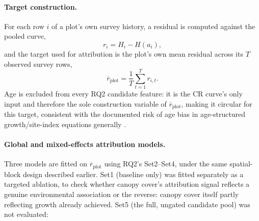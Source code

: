 \documentclass[11pt,a4paper]{report}
\begin{document}
\paragraph*{Target construction.}
For each row $i$ of a plot's own survey history, a residual is computed against the pooled curve,
\begin{equation}
r_i = H_i - H(a_i),
\label{eq:cr-residual}
\end{equation}
and the target used for attribution is the plot's own mean residual across its $T$ observed
survey rows,
\begin{equation}
\overline{r}_{\text{plot}} = \frac{1}{T}\sum_{t=1}^{T} r_{i,t}.
\label{eq:mean-cr-residual}
\end{equation}
Age is excluded from every RQ2 candidate feature: it is the CR curve's only input and therefore
the sole construction variable of $\overline{r}_{\text{plot}}$, making it circular for this
target, consistent with the documented risk of age bias in age-structured growth/site-index
equations generally \citep{socha2016AgeBias}. %

\paragraph*{Global and mixed-effects attribution models.}
Three models are fitted on $\overline{r}_{\text{plot}}$ using RQ2's Set2--Set4, under the same
spatial-block design described earlier. Set1
(baseline only) was fitted separately as a targeted ablation, to check whether canopy cover's
attribution signal reflects a genuine environmental association or the reverse: canopy cover
itself partly reflecting growth already achieved. Set5 (the full, ungated candidate pool) was not
evaluated:
\end{document}
